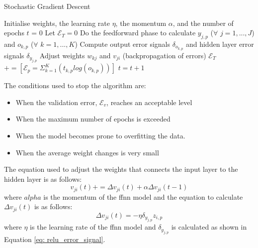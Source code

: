 \documentclass[10pt, conference]{IEEEtran}
\begin{document}
\begin{algorithm}[H]
    \caption{Stochastic Gradient Descent}
    \label{alg:SGD_algorithm}
    \begin{algorithmic}[1]
        \State Initialise weights, the learning rate $\eta$, the momentum $\alpha$, and the number of epochs $t$ = 0
            \State Let $\mathcal{E}_T = 0$
                \State Do the feedforward phase to calculate $y_{j,p}$ ($\forall$ $j = 1,...,J$) and $o_{k,p}$ ($\forall$ $k = 1,...,K$)
                \State Compute output error signals $\delta_{o_{k,p}}$ and hidden layer error signals $\delta_{y_{j,p}}$
                \State Adjust weights $w_{kj}$ and $v_{ji}$ (backpropagation of errors)
                \State $\mathcal{E}_T$ $+= [\mathcal{E}_p = \Sigma_{k=1}^K (t_{k,p}log(o_{k,p}))]$
            \EndFor
            \State $t = t + 1$
        \EndWhile
    \end{algorithmic}
\end{algorithm}

The conditions used to stop the algorithm are:
\begin{itemize}
    \item When the validation error, $\mathcal{E}_v$, reaches an acceptable level
    \item When the maximum number of epochs is exceeded
    \item When the model becomes prone to overfitting the data.
    \item When the average weight changes is very small
\end{itemize}

The equation used to adjust the weights that connects the input layer to the hidden layer is as follows:
\begin{equation}
    v_{ji}(t) += \Delta v_{ji}(t) + \alpha \Delta v_{ji}(t-1) \label{eq: v_weights_update}
\end{equation}
where $alpha$ is the momentum of the \acrshort{ffnn} model and the equation to calculate $\Delta v_{ji}(t)$ is as
follows:
\begin{equation}
    \Delta v_{ji}(t) = -\eta \delta_{y_{j,p}} z_{i,p} \label{eq: delta_v}
\end{equation}
where $\eta$ is the learning rate of the \acrshort{ffnn} model and $\delta_{y_{j,p}}$ is calculated as shown
in Equation \ref{eq: relu_error_signal}.
\end{document}
